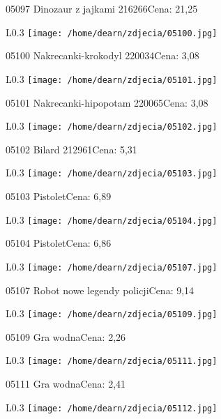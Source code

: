 05097 Dinozaur z jajkami 216266Cena: 21,25\newline
\begin{wrapfigure}{L}{0.3\textwidth}
\texttt{[image: /home/dearn/zdjecia/05100.jpg]}
\end{wrapfigure}
05100 Nakrecanki-krokodyl 220034Cena: 3,08\newline
\begin{wrapfigure}{L}{0.3\textwidth}
\texttt{[image: /home/dearn/zdjecia/05101.jpg]}
\end{wrapfigure}
05101 Nakrecanki-hipopotam 220065Cena: 3,08\newline
\begin{wrapfigure}{L}{0.3\textwidth}
\texttt{[image: /home/dearn/zdjecia/05102.jpg]}
\end{wrapfigure}
05102 Bilard 212961Cena: 5,31\newline
\begin{wrapfigure}{L}{0.3\textwidth}
\texttt{[image: /home/dearn/zdjecia/05103.jpg]}
\end{wrapfigure}
05103 PistoletCena: 6,89\newline
\begin{wrapfigure}{L}{0.3\textwidth}
\texttt{[image: /home/dearn/zdjecia/05104.jpg]}
\end{wrapfigure}
05104 PistoletCena: 6,86\newline
\begin{wrapfigure}{L}{0.3\textwidth}
\texttt{[image: /home/dearn/zdjecia/05107.jpg]}
\end{wrapfigure}
05107 Robot nowe legendy policjiCena: 9,14\newline
\begin{wrapfigure}{L}{0.3\textwidth}
\texttt{[image: /home/dearn/zdjecia/05109.jpg]}
\end{wrapfigure}
05109 Gra wodnaCena: 2,26\newline
\begin{wrapfigure}{L}{0.3\textwidth}
\texttt{[image: /home/dearn/zdjecia/05111.jpg]}
\end{wrapfigure}
05111 Gra wodnaCena: 2,41\newline
\begin{wrapfigure}{L}{0.3\textwidth}
\texttt{[image: /home/dearn/zdjecia/05112.jpg]}
\end{wrapfigure}
